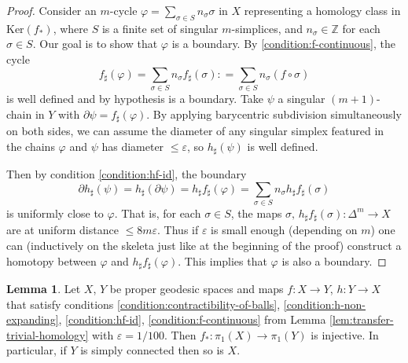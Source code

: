 \documentclass[12pt]{amsart}
\theoremstyle{definition}
\def\fnum{equation}
\newtheorem{lemma}[\fnum]{Lemma}
\numberwithin{equation}{section}
\newcommand{\Ker}{{\text{Ker}}}
\begin{document}
\begin{proof}
     Consider an $m$-cycle  $\varphi = \sum_{\sigma \in S} n_{\sigma} \sigma$ in $X$ representing a homology class in $\Ker (f_{\ast})$, where $S$ is a finite set of singular $m$-simplices, and $n_{\sigma} \in \mathbb{Z} $ for each $\sigma \in S$. Our goal is to show that $\varphi$ is a boundary.  By \eqref{condition:f-continuous}, the cycle 
     \[ f_{\sharp} ( \varphi )  = \sum_{\sigma \in S} n_{\sigma } f _{\sharp } (\sigma ) : = \sum_{\sigma \in S} n_{\sigma } (f \circ \sigma ) \] 
     is well defined and by hypothesis is a boundary. Take $\psi$ a singular $(m+1)$-chain in $Y$ with $\partial \psi = f_{\sharp} ( \varphi ) $. By applying barycentric subdivision simultaneously on both sides, we can assume the diameter of any singular simplex featured in the chains $\varphi$ and $\psi $ has diameter $\leq \varepsilon$, so $h_{\sharp} ( \psi )$ is well defined.

    Then by condition \eqref{condition:hf-id}, the boundary 
    \[ \partial h_{\sharp }(\psi ) = h_{\sharp } ( \partial \psi ) = h_{\sharp } f_{\sharp } ( \varphi  )  = \sum_{\sigma \in S} n_{\sigma } h_{\sharp } f_{\sharp } ( \sigma ) \]
    is uniformly close to $\varphi$. That is, for each $\sigma \in S$, the maps $\sigma ,  \, h_{\sharp} f_{\sharp} (\sigma ) : \Delta ^ m \to X $ are at uniform distance $\leq 8 m  \varepsilon .$ Thus if $\varepsilon $ is small enough (depending on $m$) one can (inductively on the skeleta just like at the beginning of the proof)  construct a homotopy  between $ \varphi $ and $h_{\sharp } f_{\sharp } ( \varphi )$. This implies that $\varphi$ is also a boundary. 

\end{proof}


\begin{lemma}\label{lem:transfer-simply-connected}
 Let $X$, $Y$ be proper geodesic spaces and maps $f: X \to Y$, $h : Y \to X$ that satisfy conditions \eqref{condition:contractibility-of-balls}, \eqref{condition:h-non-expanding}, \eqref{condition:hf-id},  \eqref{condition:f-continuous} from Lemma \ref{lem:transfer-trivial-homology} with $\varepsilon = 1/100$. Then $f_{\ast} : \pi_1 (X) \to \pi_1(Y)$ is injective. In particular, if $Y$ is simply connected then so is $X$. 
\end{lemma}
\end{document}
